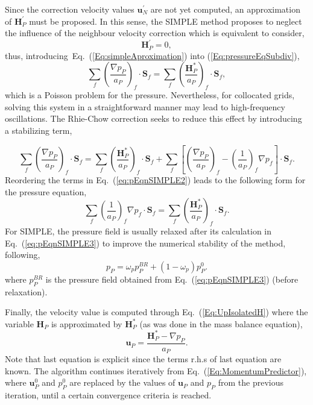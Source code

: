 \documentclass[final,3p,times,11pt,onecolumn]{myElsarticle}
\numberwithin{equation}{section}
\begin{document}
Since the correction velocity values $\boldsymbol{u}_N^{'}$  are not yet computed, an approximation of $\boldsymbol{H}_P^{'}$ must be proposed. In this sense, the SIMPLE method proposes to neglect the influence of the neighbour velocity correction which is equivalent to consider,
\begin{equation}
\label{Eq:simpleAproximation}
\boldsymbol{H}_P^{'} = 0,
\end{equation}
thus, introducing~Eq.~(\ref{Eq:simpleAproximation}) into (\ref{Eq:pressureEqSubdiv}),
\begin{equation}
\sum_{f} 
\left(
\dfrac
{
\nabla p_P}
{a_P}
\right)_f
\cdotp 
\textbf{S}_{f}
=
\sum_f 
\left(
\dfrac
{
\boldsymbol{H}_P^*
}
{
a_P
}
\right)_f
\cdot
\boldsymbol{S}_f,
\label{eq:div-free5}  
\end{equation}
which is a Poisson problem for the pressure. Nevertheless, for collocated grids, solving this system in a straightforward manner may lead to high-frequency oscillations. The Rhie-Chow correction \cite{rhiechow} seeks to reduce this effect by introducing a stabilizing term, 

\begin{equation}
\label{eq:pEqnSIMPLE2}
\sum_{f} 
\left(
\dfrac
{
\nabla p_P}
{a_P}
\right)_f
\cdotp 
\textbf{S}_{f} 
=
\sum_f 
\left(
\dfrac{
\boldsymbol{H}_P^*
}
{
a_P
}
\right)_f
\cdot
\boldsymbol{S}_f 
+
\sum_f  
\left[
\left(
\frac{\nabla p_P}{a_P}
\right)_f
- 
\left(
\frac{1}{a_P}
\right)_f 
\nabla p_f
\right]
\cdot 
\boldsymbol{S}_f.
\end{equation}
Reordering the terms in Eq.~(\ref{eq:pEqnSIMPLE2}) leads to the following form for the pressure equation,
\begin{equation}\label{eq:pEqnSIMPLE3}
\sum_f \left(\frac{1}{a_P}\right)_f \nabla p_f 
\cdot
\boldsymbol{S}_f 
=  \sum_f \left(\frac{\boldsymbol{H}_P^*}{a_P}\right)_f \cdot \boldsymbol{S}_f.
\end{equation}
For SIMPLE, the pressure field is usually relaxed after its calculation in Eq.~(\ref{eq:pEqnSIMPLE3}) to improve the numerical stability of the method, following,
\begin{equation}
\label{eq:relaxP}
p_P
=
\omega_p p_P^{BR} + (1-\omega_p) p_P^0.
\end{equation}
\noindent where $p_P^{BR}$ is the pressure field obtained from Eq.~(\ref{eq:pEqnSIMPLE3}) (before relaxation).

Finally, the velocity value is computed through Eq.~(\ref{Eq:UpIsolatedH}) where the variable $\boldsymbol{H}_P$ is approximated by $\boldsymbol{H}_P^{*}$ (as was done in the mass balance equation),
\begin{equation}
\label{eq:SIMPLECorr}
\boldsymbol{u}_P
=
\dfrac
{
\boldsymbol{H}_P^*
- 
\nabla p_P}
{a_P}.
\end{equation}
Note that last equation is explicit since the terms r.h.s of last equation are known. The algorithm continues iteratively from Eq.~(\ref{Eq:MomentumPredictor}), where $\boldsymbol{u}_P^0$ and $p_P^0$ are replaced by the values of $\boldsymbol{u}_P$ and $p_P$ from the previous iteration, until a certain convergence criteria is reached.
\end{document}
